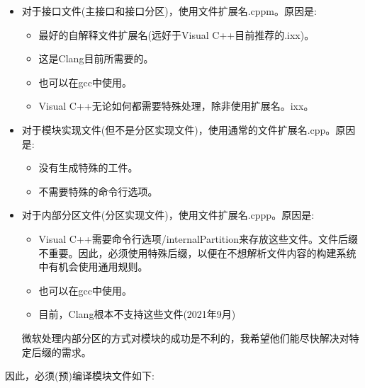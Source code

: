 \begin{itemize}
\item 
对于接口文件(主接口和接口分区)，使用文件扩展名.cppm。原因是:

\begin{itemize}
\item 
最好的自解释文件扩展名(远好于Visual C++目前推荐的.ixx)。

\item 
这是Clang目前所需要的。

\item 
也可以在gcc中使用。

\item 
Visual C++无论如何都需要特殊处理，除非使用扩展名。ixx。
\end{itemize}


\item 
对于模块实现文件(但不是分区实现文件)，使用通常的文件扩展名.cpp。原因是:

\begin{itemize}
\item 
没有生成特殊的工件。

\item 
不需要特殊的命令行选项。
\end{itemize}

\item 
对于内部分区文件(分区实现文件)，使用文件扩展名.cppp。原因是:

\begin{itemize}
\item 
Visual C++需要命令行选项/internalPartition来存放这些文件。文件后缀不重要。因此，必须使用特殊后缀，以便在不想解析文件内容的构建系统中有机会使用通用规则。

\item 
也可以在gcc中使用。

\item 
目前，Clang根本不支持这些文件(2021年9月)
\end{itemize}

微软处理内部分区的方式对模块的成功是不利的，我希望他们能尽快解决对特定后缀的需求。

\end{itemize}

因此，必须(预)编译模块文件如下:

